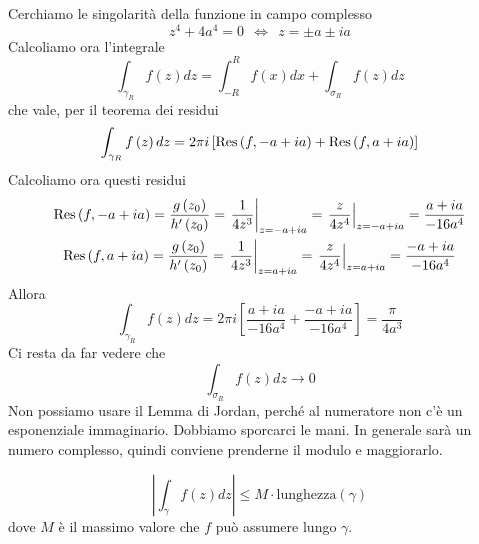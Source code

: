 \begin{figure}[htpb]
\end{figure}
\FloatBarrier

Cerchiamo le singolarità della funzione in campo complesso
\begin{equation*}
z^{4} + 4a^{4} = 0\ \ \iff \ \ z = \pm a\pm ia
\end{equation*}
Calcoliamo ora l'integrale
\begin{equation*}
\int _{\gamma _{R}} f\left(z\right) dz = \int ^{R}_{ - R} f\left(x\right) dx + \int _{\sigma _{R}} f\left(z\right) dz
\end{equation*}
che vale, per il teorema dei residui
\begin{equation*}
\int _{\gamma _{R}} f\left(z\right) dz = 2\pi i\left[\operatorname{Res} \left(f, - a + ia\right) + \operatorname{Res} \left(f,a + ia\right)\right]
\end{equation*}
Calcoliamo ora questi residui
\begin{gather*}
\operatorname{Res} \left(f, - a + ia\right) = \frac{g\left(z_{0}\right)}{h'\left(z_{0}\right)} = \left. \frac{1}{4z^{3}}\right| _{z = -a + ia} = \left. \frac{z}{4z^{4}}\right| _{z = -a + ia} = \frac{a + ia}{ - 16a^{4}}\\
\operatorname{Res} \left(f,a + ia\right) = \frac{g\left(z_{0}\right)}{h'\left(z_{0}\right)} = \left. \frac{1}{4z^{3}}\right| _{z = a + ia} = \left. \frac{z}{4z^{4}}\right| _{z = a + ia} = \frac{ - a + ia}{ - 16a^{4}}
\end{gather*}
Allora
\begin{equation*}
\int _{\gamma _{R}} f\left(z\right) dz = 2\pi i\left[\frac{a + ia}{ - 16a^{4}} + \frac{ - a + ia}{ - 16a^{4}}\right] = \frac{\pi }{4a^{3}}
\end{equation*}
Ci resta da far vedere che
\begin{equation*}
\int _{\sigma _{R}} f\left(z\right) dz\rightarrow 0
\end{equation*}
Non possiamo usare il Lemma di Jordan, perché al numeratore non c'è un esponenziale immaginario. Dobbiamo sporcarci le mani. In generale sarà un numero complesso, quindi conviene prenderne il modulo e maggiorarlo.
\begin{rem}
\begin{equation*}
\left| \int _{\gamma } f\left(z\right) dz\right| \leq M\cdot \text{lunghezza}\left(\gamma \right)
\end{equation*}
dove $M$ è il massimo valore che $f$ può assumere lungo $\gamma $.
\end{rem}
